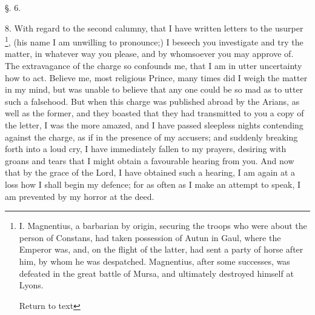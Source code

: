 §. 6.

8. With regard to the second calumny, that I have written letters to the
usurper \footnote{I. Magnentius, a barbarian by origin, securing the troops who were about
the person of Constans, had taken possession of Autun in Gaul, where
the Emperor was, and, on the flight of the latter, had sent a party of
horse after him, by whom he was despatched. Magnentius, after some
successes, was defeated in the great battle of Mursa, and ultimately
destroyed himself at Lyons.

Return to text}, (his name I am
unwilling to pronounce;) I beseech you investigate and try the
matter, in whatever way you please, and by whomsoever you may approve
of. The extravagance of the charge so confounds me, that I am in utter
uncertainty how to act. Believe me, most religious Prince, many times
did I weigh the matter in my mind, but was unable to believe that any
one could be so mad as to utter such a falsehood. But when this charge
was published abroad by the Arians, as well as the former, and they
boasted that they had transmitted to you a copy of the letter, I was
the more amazed, and I have passed sleepless nights contending against
the charge, as if in the presence of my accusers; and suddenly
breaking forth into a loud cry, I have immediately fallen to my
prayers, desiring with groans and tears that I might obtain a
favourable hearing from you. And now that by the grace of the Lord, I
have obtained such a hearing, I am again at a loss how I shall begin
my defence; for as often as I make an attempt to speak, I am prevented
by my horror at the deed.

